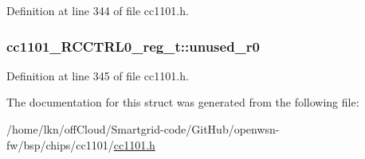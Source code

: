 Definition at line 344 of file cc1101.\+h.

\subsubsection[{\texorpdfstring{unused\+\_\+r0}{unused_r0}}]{ cc1101\+\_\+\+R\+C\+C\+T\+R\+L0\+\_\+reg\+\_\+t\+::unused\+\_\+r0}\hypertarget{structcc1101___r_c_c_t_r_l0__reg__t_aa3b909faf53690329676247d4dac2879}{}\label{structcc1101___r_c_c_t_r_l0__reg__t_aa3b909faf53690329676247d4dac2879}


Definition at line 345 of file cc1101.\+h.



The documentation for this struct was generated from the following file\+:\begin{DoxyCompactItemize}
\item 
/home/lkn/off\+Cloud/\+Smartgrid-\/code/\+Git\+Hub/openwsn-\/fw/bsp/chips/cc1101/\hyperlink{cc1101_8h}{cc1101.\+h}\end{DoxyCompactItemize}
